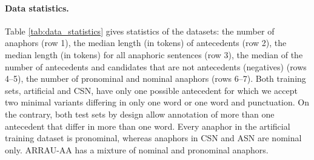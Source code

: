 \documentclass[11pt,letterpaper]{article}
\begin{document}
\paragraph{Data statistics.} 
Table \ref{tab:data_statistics} gives statistics of the datasets: the number of anaphors (row 1), the median length (in tokens) of antecedents (row 2), the median length (in tokens) for all anaphoric sentences (row 3), the median of the number of antecedents and candidates that are not antecedents (negatives) (rows 4--5), the number of pronominal and nominal anaphors (rows 6--7). Both training sets, artificial and CSN, have only one possible antecedent for which we accept two minimal variants differing in only one word or one word and punctuation.
On the contrary, both test sets by design allow annotation of more than one antecedent that differ in more than one word. Every anaphor in the artificial training dataset is pronominal, whereas anaphors in CSN and ASN are nominal only. ARRAU-AA has a mixture of nominal and pronominal anaphors.
\end{document}
